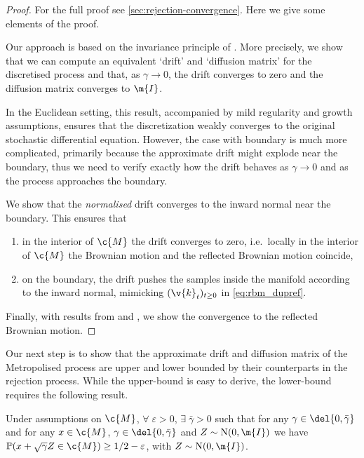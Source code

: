 \begin{proof}
	For the full proof see \cref{sec:rejection-convergence}.
	Here we give some elements of the proof.

	Our approach is based on the invariance principle of \cite{stroock1971diffusion}.
	More precisely, we show that we can compute an equivalent `drift' and `diffusion matrix' for the discretised process and that, as \(\gamma \to 0\), the drift converges to zero and the diffusion matrix converges to \(\m{I}\).

	In the Euclidean setting, this result, accompanied by mild regularity and growth assumptions, ensures that the discretization weakly converges to the original stochastic differential equation.
	However, the case with boundary is much more complicated, primarily because the approximate drift might explode near the boundary, thus we need to verify exactly how the drift behaves as \(\gamma \to 0\) and as the process approaches the boundary.

	We show that the \emph{normalised} drift converges to the inward normal near the boundary.
	This ensures that \begin{enumerate}[label=(\alph*)] \item in the interior of \(\c{M}\) the drift converges to zero, i.e.~locally in the interior of \(\c{M}\) the Brownian motion and the reflected Brownian motion coincide, \item on the boundary, the drift pushes the samples inside the manifold according to the inward normal, mimicking \((\v{k}_t)_{t \geq 0}\) in \eqref{eq:rbm_dupref}.
	\end{enumerate}
	Finally, with results from \cite{stroock1971diffusion} and \cite{kang2017submartingale}, we show the convergence to the reflected Brownian motion.

\end{proof}

Our next step is to show that the approximate drift and diffusion matrix of the Metropolised process are upper and lower bounded by their counterparts in the rejection process.
While the upper-bound is easy to derive, the lower-bound requires the following result.

\begin{proposition}
	\label{lemma:lower_bound_prob_main}
	Under assumptions on \(\c{M}\), \(\forall \; \varepsilon > 0\), \(\exists \; \bar{\gamma} >0\) such that for any \(\gamma \in \del{0, \bar{\gamma}}\) and for any \(x \in \c{M}\), \(\gamma \in \del{0, \bar{\gamma}}\) and \(Z \sim \mathrm{N}(0, \m{I})\) we have \(\mathbb{P}(x + \sqrt{\gamma} Z \in \c{M}) \geq 1/2-\varepsilon\), with \(Z \sim \mathrm{N}(0, \m{I})\).
\end{proposition}

